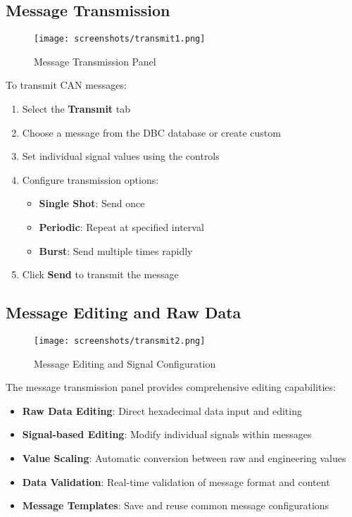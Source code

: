 \documentclass[11pt,a4paper]{article}
\begin{document}
\subsection{Message Transmission}

\begin{figure}[H]
    \centering
    \texttt{[image: screenshots/transmit1.png]}
    \caption{Message Transmission Panel}
    \label{fig:transmit1}
\end{figure}

To transmit CAN messages:

\begin{enumerate}
    \item Select the \textbf{Transmit} tab
    \item Choose a message from the DBC database or create custom
    \item Set individual signal values using the controls
    \item Configure transmission options:
    \begin{itemize}
        \item \textbf{Single Shot}: Send once
        \item \textbf{Periodic}: Repeat at specified interval
        \item \textbf{Burst}: Send multiple times rapidly
    \end{itemize}
    \item Click \textbf{Send} to transmit the message
\end{enumerate}

\subsection{Message Editing and Raw Data}

\begin{figure}[H]
    \centering
    \texttt{[image: screenshots/transmit2.png]}
    \caption{Message Editing and Signal Configuration}
    \label{fig:transmit2}
\end{figure}

The message transmission panel provides comprehensive editing capabilities:

\begin{itemize}
    \item \textbf{Raw Data Editing}: Direct hexadecimal data input and editing
    \item \textbf{Signal-based Editing}: Modify individual signals within messages
    \item \textbf{Value Scaling}: Automatic conversion between raw and engineering values
    \item \textbf{Data Validation}: Real-time validation of message format and content
    \item \textbf{Message Templates}: Save and reuse common message configurations
\end{itemize}
\end{document}

